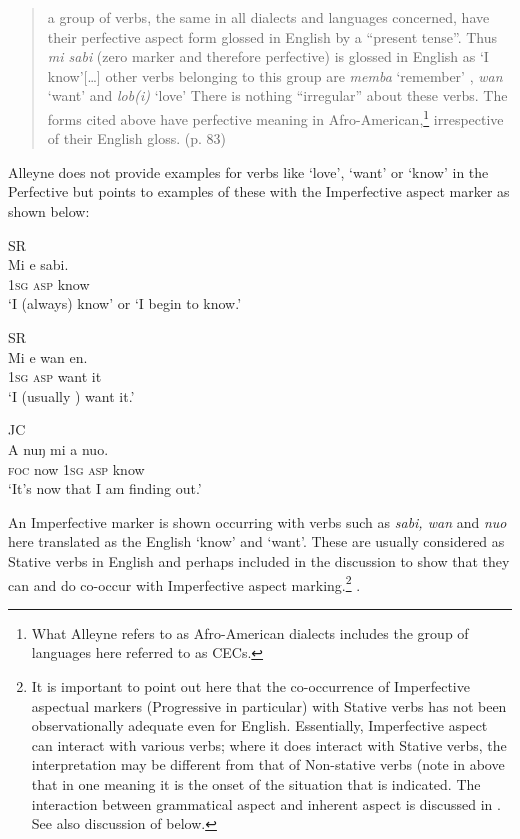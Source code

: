 \begin{quote}
a group of verbs, the same in all dialects and languages concerned,
have their perfective aspect form glossed in English by a “present
tense”. Thus \textit{mi sabi} (zero marker and therefore perfective)
is glossed in English as `I know'[…] other verbs belonging to this
group are \textit{memba} `remember' , \textit{wan} `want' and
\textit{lob(i)} `love' There is nothing “irregular” about these
verbs. The forms cited above have perfective meaning in
Afro-American,\footnote{What Alleyne refers to as Afro-American
  dialects includes the group of languages here referred to as CECs.}
irrespective of their English gloss. (p. 83)
\end{quote}

Alleyne does not provide examples for verbs like `love', `want' or
`know' in the Perfective but points to examples of these with the
Imperfective aspect marker as shown below:

\ea\label{ex:2:3} \citep[83]{Alleyne1980}
\ea SR\\

\gll Mi e sabi.\\
		\textsc{1sg} \textsc{asp} know\\
\glt `I (always) know' or `I begin to know.'

\ex SR\\
\gll Mi e wan en.\\
	\textsc{1sg} \textsc{asp} want it                \\
\glt `I (usually ) want it.'

\ex
JC\\
\gll  A nuŋ mi a nuo.\\
\textsc{foc} now \textsc{1sg} \textsc{asp} know\\
\glt `It’s now that I am finding out.'
\z
\z

An Imperfective marker is shown occurring with verbs such as
\textit{sabi, wan} and \textit{nuo} here translated as the English
`know' and `want'.  These are usually considered as Stative verbs in
English and perhaps included in the discussion to show that they can
and do co-occur with Imperfective aspect marking.\footnote{It is
  important to point out here that the co-occurrence of Imperfective
  aspectual markers (Progressive in particular) with Stative verbs
  \citep{Vendler1967} has not been observationally adequate even for
  English. Essentially, Imperfective aspect can interact with various
  verbs; where it does interact with Stative verbs, the interpretation
  may be different from that of Non-stative verbs (note in
   above that in one meaning it is the onset of the
  situation that is indicated. The interaction between grammatical
  aspect and inherent aspect is discussed in . See also
  discussion of \citet{Sidnell2002} below.} .

